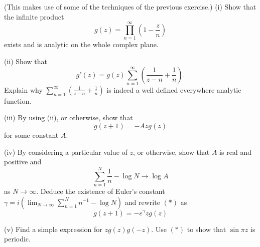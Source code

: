 \begin{exercise} (This makes use of some of the
techniques of the previous exercise.) (i) Show that the infinite product
\[g(z)=\prod_{n=1}^{\infty}\left(1-\frac{z}{n}\right)\]
exists and is analytic on the whole complex plane.

(ii) Show that
\[g'(z)=g(z)
\sum_{n=1}^{\infty}\left(\frac{1}{z-n}+\frac{1}{n}\right).\]
Explain why $\sum_{n=1}^{\infty}(\frac{1}{z-n}+\frac{1}{n})$
is indeed a well defined everywhere analytic function.

(iii) By using (ii), or otherwise, show that
\begin{equation*}
g(z+1)=-Azg(z) \tag*{(*)}
\end{equation*}
for some constant $A$.

(iv) By considering a particular value of $z$, or otherwise,
show that $A$ is real and positive and
\[\sum_{n=1}^{N}\frac{1}{n}-\log N\rightarrow \log A\]
as $N\rightarrow\infty$.
Deduce the existence of Euler's constant
$\gamma=i(\lim_{N\rightarrow\infty}\sum_{n=1}^{N}n^{-1}-\log N)$
and rewrite $(*)$ as
\begin{equation*}
g(z+1)=-e^{\gamma}zg(z) 
\end{equation*}

(v) Find a simple expression for $zg(z)g(-z)$. Use $(*)$
to show that $\sin \pi z$ is periodic.
\end{exercise}
